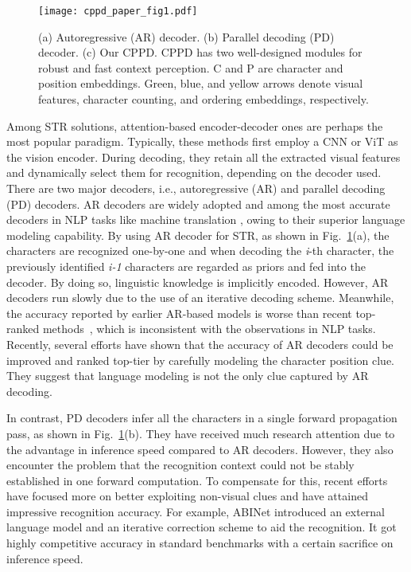 \documentclass[10pt,journal,compsoc]{IEEEtran}
\begin{document}
\begin{figure}[t] 
\centering
\texttt{[image: cppd\_paper\_fig1.pdf]}  
\caption{(a) Autoregressive (AR) decoder. (b) Parallel decoding (PD) decoder. (c) Our CPPD. CPPD has two well-designed modules for robust and fast context perception. C and P are character and position embeddings. Green, blue, and yellow arrows denote visual features, character counting, and ordering embeddings, respectively.}  
\label{fig:fig1}  
\end{figure}

Among STR solutions, attention-based encoder-decoder ones are perhaps the most popular paradigm. Typically, these methods first employ a CNN \cite{He_2016_CVPR} or ViT \cite{dosovitskiy2020vit} as the vision encoder. During decoding, they retain all the extracted visual features and dynamically select them for recognition, depending on the decoder used. There are two major decoders, i.e., autoregressive (AR) and parallel decoding (PD) decoders. AR decoders are widely adopted and among the most accurate decoders in NLP tasks like machine translation \cite{NIPS2017_attn, seqtoseq, SMT}, owing to their superior language modeling capability. By using AR decoder for STR, as shown in Fig.~\ref{fig:fig1}(a), the characters are recognized one-by-one and when decoding the \emph{i}-th character, the previously identified \emph{i-1} characters are regarded as priors and fed into the decoder. By doing so, linguistic knowledge is implicitly encoded. However, AR decoders run slowly due to the use of an iterative decoding scheme. Meanwhile, the accuracy reported by earlier AR-based models \cite{li2019sar,Sheng2019nrtr} is worse than recent top-ranked methods~\cite{fang2021abinet,BautistaA22PARSeq}, which is inconsistent with the observations in NLP tasks. Recently, several efforts \cite{wan2020textscanner,yue2020robustscanner,zheng2023cdistnet} have shown that the accuracy of AR decoders could be improved and ranked top-tier by carefully modeling the character position clue. They suggest that language modeling is not the only clue captured by AR decoding.



In contrast, PD decoders infer all the characters in a single forward propagation pass, as shown in Fig.~\ref{fig:fig1}(b). They have received much research attention \cite{yu2020srn,fang2021abinet,Wang_2021_visionlan} due to the advantage in inference speed compared to AR decoders. However, they also encounter the problem that the recognition context could not be stably established in one forward computation. To compensate for this, recent efforts \cite{fang2021abinet,Wang_2021_visionlan} have focused more on better exploiting non-visual clues and have attained impressive recognition accuracy. For example, ABINet \cite{fang2021abinet} introduced an external language model and an iterative correction scheme to aid the recognition. It got highly competitive accuracy in standard benchmarks with a certain sacrifice on inference speed. 
\end{document}
